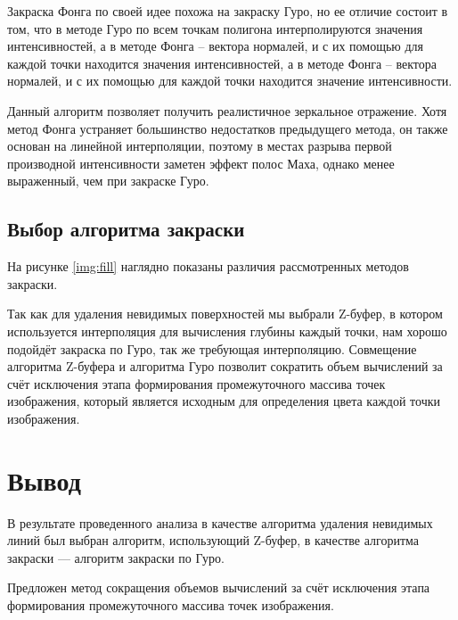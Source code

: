 Закраска Фонга по своей идее похожа на закраску Гуро, но ее отличие состоит в том, что в методе Гуро по всем точкам полигона интерполируются значения интенсивностей, а в методе Фонга – вектора нормалей, и с их помощью для каждой точки находится значения интенсивностей, а в методе Фонга – вектора нормалей, и с их помощью для каждой точки находится значение интенсивности. \cite{Dunn}

Данный алгоритм позволяет получить реалистичное зеркальное отражение.
Хотя метод Фонга устраняет большинство недостатков предыдущего метода, он также основан на линейной интерполяции, поэтому в местах разрыва первой производной интенсивности заметен эффект полос Маха, однако менее выраженный, чем при закраске Гуро.

\subsection{Выбор алгоритма закраски}

На рисунке \ref{img:fill} наглядно показаны различия рассмотренных методов закраски.


Так как для удаления невидимых поверхностей мы выбрали Z-буфер, в котором используется интерполяция для вычисления глубины каждый точки, нам хорошо подойдёт закраска по Гуро, так же требующая интерполяцию.
Совмещение алгоритма Z-буфера и алгоритма Гуро позволит сократить объем вычислений за счёт исключения этапа формирования промежуточного массива точек изображения, который является исходным для определения цвета каждой точки изображения.

\section*{Вывод}

В результате проведенного анализа в качестве алгоритма удаления невидимых линий был выбран алгоритм, использующий Z-буфер, в качестве алгоритма закраски — алгоритм закраски по Гуро.

Предложен метод сокращения объемов вычислений за счёт исключения этапа формирования промежуточного массива точек изображения.
